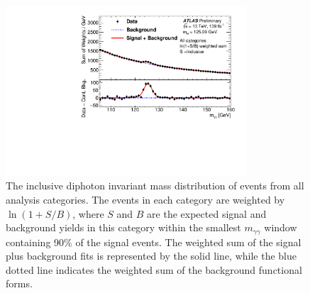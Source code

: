 \begin{figure}
    \centering
    \includegraphics[width=0.8\textwidth]{figures/couplings_chapter/weighted_coupling2020_all.pdf}
    \caption{The inclusive diphoton invariant mass distribution of events from all analysis categories. The events in each category are weighted by $\ln(1+S/B)$, where $S$ and $B$ are the expected signal and background yields in this category within the smallest $m_{\gamma \gamma}$ window containing 90\% of the signal events. The weighted sum of the signal plus background fits is represented by the solid line, while the blue dotted line indicates the weighted sum of the background functional forms. }
    \label{fig:result:inclusivemgg}
\end{figure}

